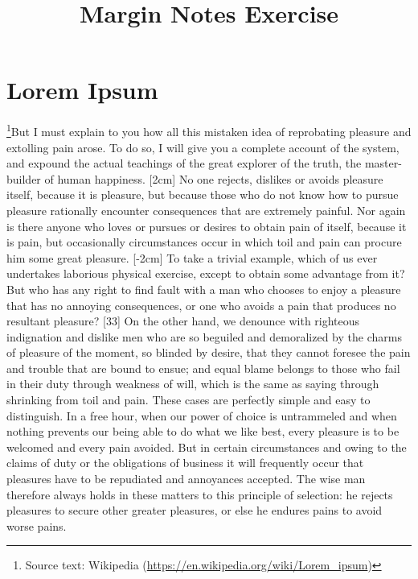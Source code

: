 \documentclass{article}
\title{Margin Notes Exercise}
\begin{document}
	\maketitle
	\section{Lorem Ipsum}
	\footnote{Source text: Wikipedia (\url{https://en.wikipedia.org/wiki/Lorem_ipsum})}But I must explain to you how all this mistaken idea of reprobating pleasure and extolling pain arose. To do so, I will give you a complete account of the system, and expound the actual teachings of the great explorer of the truth, the master-builder of human happiness. [2cm] No one rejects, dislikes or avoids pleasure itself, because it is pleasure, but because those who do not know how to pursue pleasure rationally encounter consequences that are extremely painful. Nor again is there anyone who loves or pursues or desires to obtain pain of itself, because it is pain, but occasionally circumstances occur in which toil and pain can procure him some great pleasure. \reversemarginpar{}[-2cm] To take a trivial example, which of us ever undertakes laborious physical exercise, except to obtain some advantage from it? But who has any right to find fault with a man who chooses to enjoy a pleasure that has no annoying consequences, or one who avoids a pain that produces no resultant pleasure? [33] On the other hand, we denounce with righteous indignation and dislike men who are so beguiled and demoralized by the charms of pleasure of the moment, so blinded by desire, that they cannot foresee the pain and trouble that are bound to ensue; and equal blame belongs to those who fail in their duty through weakness of will, which is the same as saying through shrinking from toil and pain. These cases are perfectly simple and easy to distinguish. In a free hour, when our power of choice is untrammeled and when nothing prevents our being able to do what we like best, every pleasure is to be welcomed and every pain avoided. But in certain circumstances and owing to the claims of duty or the obligations of business it will frequently occur that pleasures have to be repudiated and annoyances accepted. The wise man therefore always holds in these matters to this principle of selection: he rejects pleasures to secure other greater pleasures, or else he endures pains to avoid worse pains.
\end{document}
